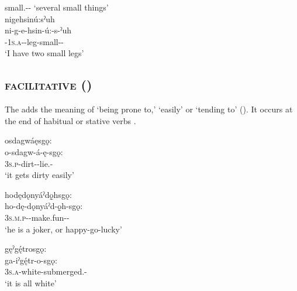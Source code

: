 \ea\label{ex:vpluralex5}  small.{\stative}-{\plural}-{\diminutive} ‘several small things’\\
nigehsinú:sˀuh\\
\gll ni-g-e-hsin-ú:-s-ˀuh\\
 {\partitive}-\textsc{1s.a}-{\joinerE}-leg-small-{\plural}-\exsc{\diminutive}\\
\glt `I have two small legs'
\z



\subsection{ \textsc{facilitative} ({\facilitative})} \label{[-sgǫ:] (facilitative)}
The  \textsc{\facilitative} adds the meaning of ‘being prone to,’ ‘easily’ or ‘tending to’ (\cite[505]{mithun_watewayestanih_1984}). It occurs at the end of habitual or stative verbs .

\ea\label{ex:facilex} 
\ea osdagwáęsgǫ:\\
\gll o-sdagw-á-ę-sgǫ:\\
 \textsc{3s.p}-dirt-{\joinerA}-lie.{\stative}-\exsc{\facilitative}\\
\glt `it gets dirty easily'


\ex hodędǫnyáˀdǫ̱hsgǫ:\\
\gll ho-dę-dǫnyáˀd-ǫ̱h-sgǫ:\\
 \textsc{3s.m.p}-{\semireflexive}-make.fun-{\stative}-\exsc{\facilitative}\\
\glt `he is a joker, or happy-go-lucky'


\ex gęˀgę́trosgǫ:\\ 
\gll ga-iˀgę́tr-o-sgǫ:\\
\textsc{3s.a}-white-submerged.{\stative}-\exsc{\facilitative}\\
\glt ‘it is all white’
\z
\z


